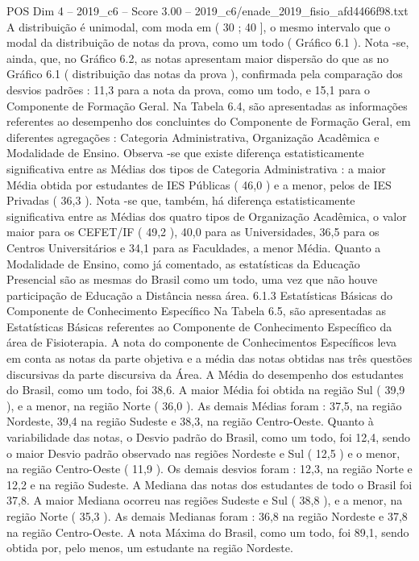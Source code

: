 \begin{textsample}{POS Dim 4 – 2019\_c6 – Score 3.00 – 2019\_c6/enade\_2019\_fisio\_afd4466f98.txt}
A distribuição é unimodal, com moda em ( 30 ; 40 ], o mesmo intervalo que o modal da distribuição de notas da prova, como um todo ( Gráfico 6.1 ).
Nota -se, ainda, que, no Gráfico 6.2, as notas apresentam maior dispersão do que as no Gráfico 6.1 ( distribuição das notas da prova ), confirmada pela comparação dos desvios padrões : 11,3 para a nota da prova, como um todo, e 15,1 para o Componente de Formação Geral.
Na Tabela 6.4, são apresentadas as informações referentes ao desempenho dos concluintes do Componente de Formação Geral, em diferentes agregações : Categoria Administrativa, Organização Acadêmica e Modalidade de Ensino.
Observa -se que existe diferença estatisticamente significativa entre as Médias dos tipos de Categoria Administrativa : a maior Média obtida por estudantes de IES Públicas ( 46,0 ) e a menor, pelos de IES Privadas ( 36,3 ).
Nota -se que, também, há diferença estatisticamente significativa entre as Médias dos quatro tipos de Organização Acadêmica, o valor maior para os CEFET/IF ( 49,2 ), 40,0 para as Universidades, 36,5 para os Centros Universitários e 34,1 para as Faculdades, a menor Média.
Quanto a Modalidade de Ensino, como já comentado, as estatísticas da Educação Presencial são as mesmas do Brasil como um todo, uma vez que não houve participação de Educação a Distância nessa área. 6.1.3 Estatísticas Básicas do Componente de Conhecimento Específico Na Tabela 6.5, são apresentadas as Estatísticas Básicas referentes ao Componente de Conhecimento Específico da área de Fisioterapia.
A nota do componente de Conhecimentos Específicos leva em conta as notas da parte objetiva e a média das notas obtidas nas três questões discursivas da parte discursiva da Área.
A Média do desempenho dos estudantes do Brasil, como um todo, foi 38,6.
A maior Média foi obtida na região Sul ( 39,9 ), e a menor, na região Norte ( 36,0 ).
As demais Médias foram : 37,5, na região Nordeste, 39,4 na região Sudeste e 38,3, na região Centro-Oeste.
Quanto à variabilidade das notas, o Desvio padrão do Brasil, como um todo, foi 12,4, sendo o maior Desvio padrão observado nas regiões Nordeste e Sul ( 12,5 ) e o menor, na região Centro-Oeste ( 11,9 ).
Os demais desvios foram : 12,3, na região Norte e 12,2 e na região Sudeste.
A Mediana das notas dos estudantes de todo o Brasil foi 37,8.
A maior Mediana ocorreu nas regiões Sudeste e Sul ( 38,8 ), e a menor, na região Norte ( 35,3 ).
As demais Medianas foram : 36,8 na região Nordeste e 37,8 na região Centro-Oeste.
A nota Máxima do Brasil, como um todo, foi 89,1, sendo obtida por, pelo menos, um estudante na região Nordeste.

\end{textsample}
